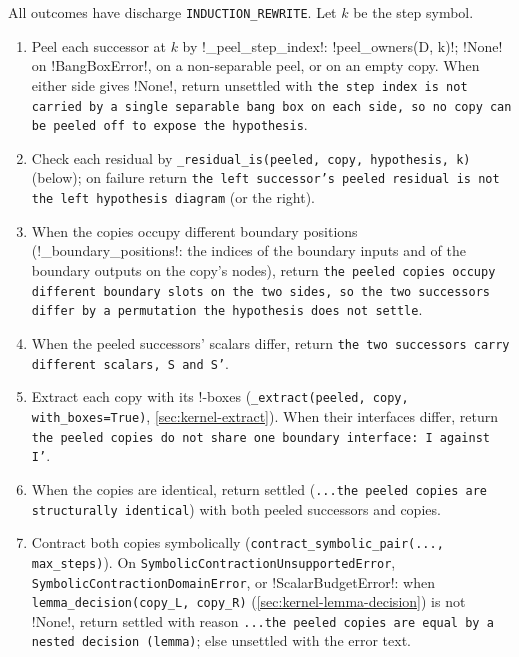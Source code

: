\begin{algorithm}\label{alg:kernel-peeled}
All outcomes have discharge \texttt{INDUCTION\_REWRITE}. Let $k$ be the step symbol.
\begin{enumerate}
\item Peel each successor at $k$ by \py!_peel_step_index!: \py!peel_owners(D, k)!; \py!None! on \py!BangBoxError!, on a non-separable peel, or on an empty copy. When either side gives \py!None!, return unsettled with \texttt{the step index is not carried by a single separable bang box on each side,\allowbreak{} so no copy can be peeled off to expose the hypothesis}.
\item Check each residual by \texttt{\_\allowbreak{}residual\_\allowbreak{}is(\allowbreak{}peeled,\allowbreak{} copy,\allowbreak{} hypothesis,\allowbreak{} k)} (below); on failure return \texttt{the left successor's peeled residual is not the left hypothesis diagram} (or the right).
\item When the copies occupy different boundary positions (\py!_boundary_positions!: the indices of the boundary inputs and of the boundary outputs on the copy's nodes), return \texttt{the peeled copies occupy different boundary slots on the two sides,\allowbreak{} so the two successors differ by a permutation the hypothesis does not settle}.
\item When the peeled successors' scalars differ, return \texttt{the two successors carry different scalars,\allowbreak{} S and S'}.
\item Extract each copy with its !-boxes (\texttt{\_\allowbreak{}extract(\allowbreak{}peeled,\allowbreak{} copy,\allowbreak{} with\_\allowbreak{}boxes=True)}, \cref{sec:kernel-extract}). When their interfaces differ, return \texttt{the peeled copies do not share one boundary interface: I against I'}.
\item When the copies are identical, return settled (\texttt{.\allowbreak{}.\allowbreak{}.\allowbreak{}the peeled copies are structurally identical}) with both peeled successors and copies.
\item Contract both copies symbolically (\texttt{contract\_\allowbreak{}symbolic\_\allowbreak{}pair(\allowbreak{}.\allowbreak{}.\allowbreak{}.\allowbreak{},\allowbreak{} max\_\allowbreak{}steps)}). On \texttt{SymbolicContractionUnsupportedError}, \texttt{SymbolicContractionDomainError}, or \py!ScalarBudgetError!: when \texttt{lemma\_\allowbreak{}decision(\allowbreak{}copy\_\allowbreak{}L,\allowbreak{} copy\_\allowbreak{}R)} (\cref{sec:kernel-lemma-decision}) is not \py!None!, return settled with reason \texttt{.\allowbreak{}.\allowbreak{}.\allowbreak{}the peeled copies are equal by a nested decision (\allowbreak{}lemma)}; else unsettled with the error text.

\end{enumerate}
\end{algorithm}
